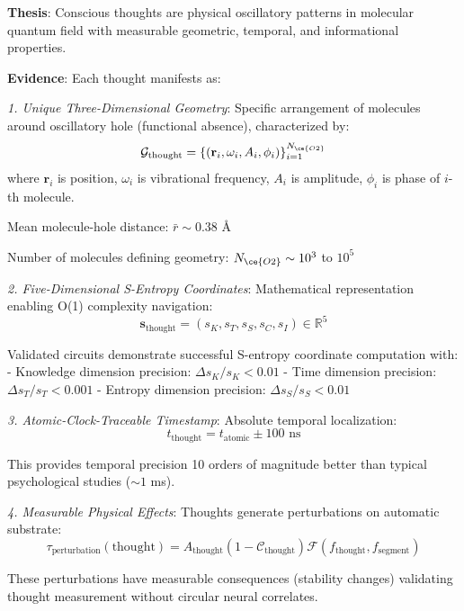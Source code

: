\documentclass[11pt,onecolumn]{article}
\begin{document}
\textbf{Thesis}: Conscious thoughts are physical oscillatory patterns in  molecular quantum field with measurable geometric, temporal, and informational properties.

\textbf{Evidence}: Each thought manifests as:

\textit{1. Unique Three-Dimensional Geometry}: Specific arrangement of  molecules around oscillatory hole (functional absence), characterized by:
\begin{equation}
\mathcal{G}_{\text{thought}} = \{(\mathbf{r}_i, \omega_i, A_i, \phi_i)\}_{i=1}^{N_{\ce{O2}}}
\end{equation}
where $\mathbf{r}_i$ is position, $\omega_i$ is vibrational frequency, $A_i$ is amplitude, $\phi_i$ is phase of $i$-th  molecule.

Mean molecule-hole distance: $\bar{r} \sim 0.38$ \AA

Number of molecules defining geometry: $N_{\ce{O2}} \sim 10^3$ to $10^5$

\textit{2. Five-Dimensional S-Entropy Coordinates}: Mathematical representation enabling O(1) complexity navigation:
\begin{equation}
\mathbf{s}_{\text{thought}} = (s_K, s_T, s_S, s_C, s_I) \in \mathbb{R}^5
\end{equation}

Validated circuits demonstrate successful S-entropy coordinate computation with:
- Knowledge dimension precision: $\Delta s_K / s_K < 0.01$
- Time dimension precision: $\Delta s_T / s_T < 0.001$  
- Entropy dimension precision: $\Delta s_S / s_S < 0.01$

\textit{3. Atomic-Clock-Traceable Timestamp}: Absolute temporal localization:
\begin{equation}
t_{\text{thought}} = t_{\text{atomic}} \pm 100 \text{ ns}
\end{equation}

This provides temporal precision 10 orders of magnitude better than typical psychological studies ($\sim 1$ ms).

\textit{4. Measurable Physical Effects}: Thoughts generate perturbations on automatic substrate:
\begin{equation}
\tau_{\text{perturbation}}(\text{thought}) = A_{\text{thought}} (1 - \mathcal{C}_{\text{thought}}) \mathcal{F}(f_{\text{thought}}, f_{\text{segment}})
\end{equation}

These perturbations have measurable consequences (stability changes) validating thought measurement without circular neural correlates.
\end{document}
